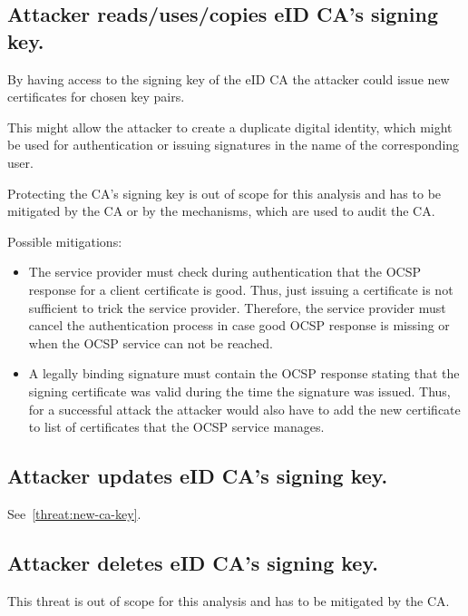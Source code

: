 \subsection{Attacker reads/uses/copies eID CA's signing key.}
By having access to the signing key of the eID CA the attacker could issue new certificates for chosen key pairs. 

This might allow the attacker to create a duplicate digital identity, which might be used for authentication or issuing signatures in the name of the corresponding user.

Protecting the CA's signing key is out of scope for this analysis and has to be mitigated by the CA or by the mechanisms, which are used to audit the CA.

Possible mitigations:
\begin{itemize}
\item The service provider must check during authentication that the OCSP response for a client certificate is good. Thus, just issuing a certificate is not sufficient to trick the service provider. Therefore, the service provider must cancel the authentication process in case good OCSP response is missing or when the OCSP service can not be reached.

\item A legally binding signature must contain the OCSP response stating that the signing certificate was valid during the time the signature was issued. Thus, for a successful attack the attacker would also have to add the new certificate to list of certificates that the OCSP service manages. 
\end{itemize}


\subsection{Attacker updates eID CA's signing key.}
See~\ref{threat:new-ca-key}.

\subsection{Attacker deletes eID CA's signing key.}
This threat is out of scope for this analysis and has to be mitigated by the CA.





